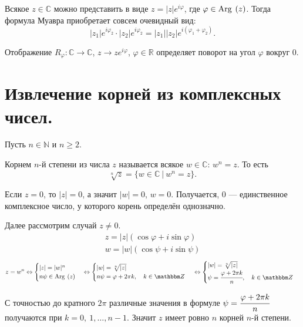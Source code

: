 Всякое $z \in \mathbb{C}$ можно представить в виде $z = |z|e^{i\varphi}$, где $\varphi \in \mathrm{Arg\:}\left(z\right)$. Тогда формула Муавра приобретает совсем очевидный вид:
\[
|z_1|e^{i\varphi_2}\cdot|z_2|e^{i\varphi_2} = |z_1||z_2|e^{i\left(\varphi_1+\varphi_2\right)}.
\]

\begin{Comment}
Отображение $R_\varphi \colon \mathbb{C}\rightarrow\mathbb{C}$, $z\rightarrow ze^{i\varphi}$, $\varphi \in \mathbb{R}$ определяет поворот на угол $\varphi$ вокруг $0$.
\end{Comment}

\section{Извлечение корней из комплексных чисел.}

Пусть $n\in\mathbb N$ и $n\geqslant2$.

\begin{Def}
Корнем $n$-й степени из числа $z$ называется всякое $w\in\mathbb C$: $w^n=z$. То есть
\[
\sqrt[n]{z} = \{w\in\mathbb C\ |\ w^n = z\}.
\]
\end{Def}

Если $z=0$, то $|z| = 0$, а значит $|w| = 0$, $w=0$. Получается, 0 --- единственное комплексное число, у которого корень определён однозначно. 

Далее рассмотрим случай $z \neq 0$. 
\begin{gather*}
z = |z|\left(\cos\varphi+i\sin\varphi\right)\\
w = |w|\left(\cos\psi+i\sin\psi\right)
\end{gather*}
\[
z = w^n \Leftrightarrow
\begin{cases}
|z| = |w|^n \\
n\psi\in\Arg\left(z\right)
\end{cases}
\Leftrightarrow
\begin{cases}
|w|= \sqrt[n]{|z|}\\
n\psi= \varphi+2\pi k,\quad k\in \mathbb Z
\end{cases}\\
\Leftrightarrow
\begin{cases}
|w|=\sqrt[n]{|z|}\\
\psi = \cfrac{\varphi+2\pi k}{n},\quad k \in \mathbb{Z}
\end{cases}
\]

С точностью до кратного $2\pi$ различные значения в формуле $\psi = \cfrac{\varphi+2\pi k }{n}$ получаются при $k = 0,\ 1,\ldots,n-1$. Значит $z$ имеет ровно $n$ корней $n$-й степени. 


